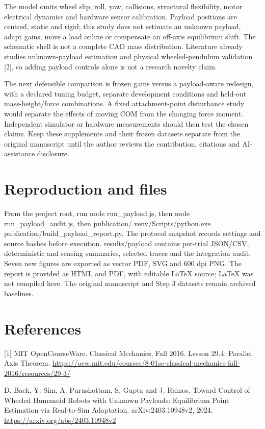 \documentclass[11pt,a4paper]{article}
\begin{document}
The model omits wheel slip, roll, yaw, collisions, structural flexibility, motor electrical dynamics and hardware sensor calibration. Payload positions are centred, static and rigid; this study does not estimate an unknown payload, adapt gains, move a load online or compensate an off-axis equilibrium shift. The schematic shell is not a complete CAD mass distribution. Literature already studies unknown-payload estimation and physical wheeled-pendulum validation [2], so adding payload controls alone is not a research novelty claim.

The next defensible comparison is frozen gains versus a payload-aware redesign, with a declared tuning budget, separate development conditions and held-out mass-height/force combinations. A fixed attachment-point disturbance study would separate the effects of moving COM from the changing force moment. Independent simulator or hardware measurements should then test the chosen claims. Keep these supplements and their frozen datasets separate from the original manuscript until the author reviews the contribution, citations and AI-assistance disclosure.

\section*{Reproduction and files}
From the project root, run node run\_payload.js, then node run\_payload\_audit.js, then publication/.venv/Scripts/python.exe publication/build\_payload\_report.py. The protocol snapshot records settings and source hashes before execution. results/payload contains per-trial JSON/CSV, deterministic and sensing summaries, selected traces and the integration audit. Seven new figures are exported as vector PDF, SVG and 600 dpi PNG. The report is provided as HTML and PDF, with editable LaTeX source; LaTeX was not compiled here. The original manuscript and Step 3 datasets remain archived baselines.

\section*{References}
[1] MIT OpenCourseWare. Classical Mechanics, Fall 2016. Lesson 29.4: Parallel Axis Theorem. \url{https://ocw.mit.edu/courses/8-01sc-classical-mechanics-fall-2016/resources/29-3/}\par
[2] D. Baek, Y. Sim, A. Purushottam, S. Gupta and J. Ramos. Toward Control of Wheeled Humanoid Robots with Unknown Payloads: Equilibrium Point Estimation via Real-to-Sim Adaptation. arXiv:2403.10948v2, 2024. \url{https://arxiv.org/abs/2403.10948v2}\par
\end{document}
